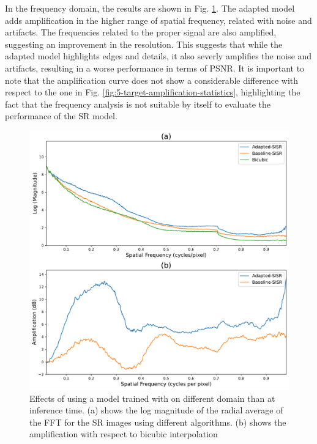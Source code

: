         In the frequency domain, the results  are shown in Fig. \ref{fig:5-target-prediction-with-domain-gap-fft}.  
        The adapted model adds amplification in the higher range of spatial frequency, related with noise and artifacts. The frequencies related to the proper signal are also amplified, suggesting an improvement in the resolution.
        This suggests that while the adapted model highlights edges and details, it also severly amplifies the noise and artifacts, resulting in a worse performance in terms of PSNR.
        It is important to note that the amplification curve does not show a considerable difference with respect to the one in Fig. \ref{fig:5-target-amplification-statistics},
        highlighting the fact that the frequency analysis is not suitable by itself to evaluate the performance of the SR model.

        \begin{figure}[H]
            \centering
            \includegraphics[scale=0.4]{Includes/5-target-prediction-with-domain-gap-fft.pdf}
            \caption{Effects of using a model trained with on different domain than at inference time. 
                     (a) shows the log magnitude of the radial average of the FFT for the SR images using different algorithms.
                     (b) shows the amplification with respect to bicubic interpolation
                     }
            \label{fig:5-target-prediction-with-domain-gap-fft}
        \end{figure}

